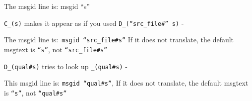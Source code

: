 \vspace{2ex} \noindent The msgid line is: msgid “s”

\vspace{2ex} \texttt{C\_(s)} makes it appear as if you used \texttt{D\_(“src\_file\#” s)} -

\vspace{2ex} \noindent The msgid line is:\texttt{ msgid “src\_file\#s”}
If it does not translate, the default msgtext is \texttt{“s”}, not \texttt{“src\_file\#s”}

\vspace{2ex} \texttt{D\_(qual\#s)} tries to look up \texttt{\_(qual\#s)} -

\vspace{2ex} \noindent This msgid line is: \texttt{msgid “qual\#s”},
If it does not translate, the default msgtext is \texttt{“s”}, not \texttt{“qual\#s”}

